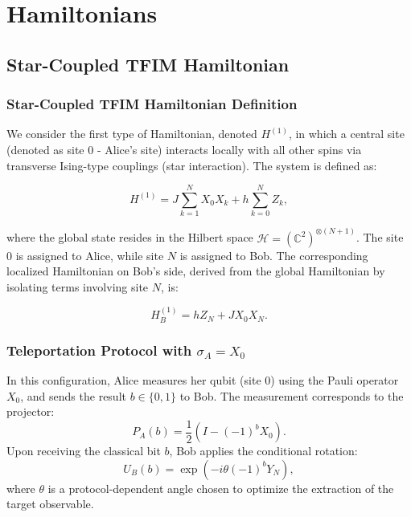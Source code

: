 \section{Hamiltonians}
\label{sec:hamiltonians}

\subsection{Star-Coupled TFIM Hamiltonian}

\subsubsection{Star-Coupled TFIM Hamiltonian Definition}
\label{sec:alice_hamiltonian}

We consider the first type of Hamiltonian, denoted \( H^{(1)} \), in which a central site (denoted as site $0$ - Alice's site) interacts locally with all other spins via transverse Ising-type couplings (star interaction). The system is defined as:

\begin{equation}
H^{(1)} = J \sum_{k=1}^{N} X_0 X_k + h \sum_{k=0}^{N} Z_k,
\label{eq:H1}
\end{equation}

where the global state resides in the Hilbert space \( \mathcal{H} = (\mathbb{C}^2)^{\otimes (N+1)} \). The site \( 0 \) is assigned to Alice, while site \( N \) is assigned to Bob. The corresponding localized Hamiltonian on Bob’s side, derived from the global Hamiltonian by isolating terms involving site \( N \), is:

\begin{equation}
H_B^{(1)} = h Z_N + J X_0 X_N.
\end{equation}

\subsubsection{Teleportation Protocol with \texorpdfstring{\( \sigma_A = X_0 \)}{sigmaAX0}}

In this configuration, Alice measures her qubit (site 0) using the Pauli operator \( X_0 \), and sends the result \( b \in \{0,1\} \) to Bob. The measurement corresponds to the projector:
\begin{equation}
P_A(b) = \frac{1}{2} \left( I - (-1)^b X_0 \right).
\end{equation}
Upon receiving the classical bit \( b \), Bob applies the conditional rotation:
\begin{equation}
U_B(b) = \exp\left( -i \theta (-1)^b Y_N \right),
\end{equation}
where \( \theta \) is a protocol-dependent angle chosen to optimize the extraction of the target observable.

